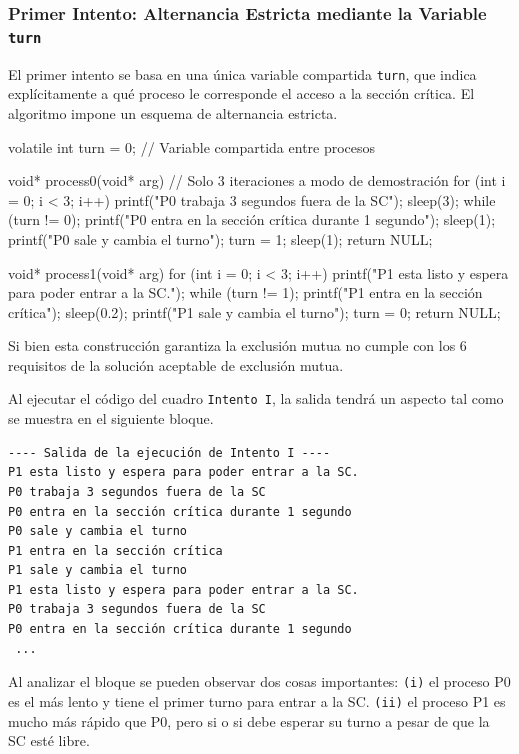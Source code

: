 \subsubsection{Primer Intento: Alternancia Estricta mediante la Variable \texttt{turn}}

El primer intento se basa en una única variable compartida \texttt{turn}, que indica explícitamente a qué proceso le corresponde el acceso a la sección crítica. El algoritmo impone un esquema de alternancia estricta.

\begin{ccode}[title=Intento I]
volatile int turn = 0; // Variable compartida entre procesos

void* process0(void* arg) {
  // Solo 3 iteraciones a modo de demostración
  for (int i = 0; i < 3; i++) {
    printf("P0 trabaja 3 segundos fuera de la SC\n");
    sleep(3);
    while (turn != 0);
    printf("P0 entra en la sección crítica durante 1 segundo\n");
    sleep(1);
    printf("P0 sale y cambia el turno\n\n");
    turn = 1;
    sleep(1);
  }
  return NULL;
}

void* process1(void* arg) {
  for (int i = 0; i < 3; i++) {
    printf("P1 esta listo y espera para poder entrar a la SC.\n\n");
    while (turn != 1);
    printf("P1 entra en la sección crítica\n");
    sleep(0.2);
    printf("P1 sale y cambia el turno\n\n");
    turn = 0;
  }
  return NULL;
}
\end{ccode}

Si bien esta construcción garantiza la exclusión mutua no cumple con los 6 requisitos de la solución aceptable de exclusión mutua.

Al ejecutar el código del cuadro \texttt{Intento I}, la salida tendrá un aspecto tal como se muestra en el siguiente bloque.

\begingroup
\footnotesize
\begin{verbatim}
---- Salida de la ejecución de Intento I ----
P1 esta listo y espera para poder entrar a la SC.
P0 trabaja 3 segundos fuera de la SC
P0 entra en la sección crítica durante 1 segundo
P0 sale y cambia el turno
P1 entra en la sección crítica
P1 sale y cambia el turno
P1 esta listo y espera para poder entrar a la SC.
P0 trabaja 3 segundos fuera de la SC
P0 entra en la sección crítica durante 1 segundo
 ...
\end{verbatim}
\endgroup 

Al analizar el bloque se pueden observar dos cosas importantes: \texttt{(i)} el proceso P0 es el más lento y tiene el primer turno para entrar a la SC. \texttt{(ii)} el proceso P1 es mucho más rápido que P0, pero si o si debe esperar su turno a pesar de que la SC esté libre.

